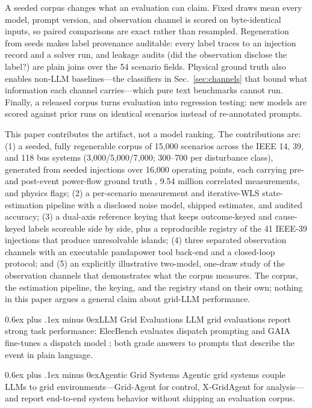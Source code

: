 \documentclass[conference]{IEEEtran}
\makeatletter
\def\subsection{\@startsection{subsection}{2}{\z@}{1.2ex plus 0.2ex minus 0.1ex}%
{0.6ex plus .1ex minus 0ex}{\normalfont\normalsize\itshape}}%
\makeatother
\begin{document}
A seeded corpus changes what an evaluation can claim. Fixed draws mean every model, prompt version, and observation channel is scored on byte-identical inputs, so paired comparisons are exact rather than resampled. Regeneration from seeds makes label provenance auditable: every label traces to an injection record and a solver run, and leakage audits (did the observation disclose the label?) are plain joins over the 54 scenario fields. Physical ground truth also enables non-LLM baselines---the classifiers in Sec.~\ref{sec:channels} that bound what information each channel carries---which pure text benchmarks cannot run. Finally, a released corpus turns evaluation into regression testing: new models are scored against prior runs on identical scenarios instead of re-annotated prompts.

This paper contributes the artifact, not a model ranking. The contributions are: (1) a seeded, fully regenerable corpus of 15,000 scenarios across the IEEE 14, 39, and 118 bus systems (3,000/5,000/7,000; 300--700 per disturbance class), generated from seeded injections over 16,000 operating points, each carrying pre- and post-event power-flow ground truth \cite{wood2014power}, 9.54 million correlated measurements, and physics flags; (2) a per-scenario measurement and iterative-WLS state-estimation pipeline with a disclosed noise model, shipped estimates, and audited accuracy; (3) a dual-axis reference keying that keeps outcome-keyed and cause-keyed labels scoreable side by side, plus a reproducible registry of the 41 IEEE-39 injections that produce unresolvable islands; (4) three separated observation channels with an executable pandapower tool back-end and a closed-loop protocol; and (5) an explicitly illustrative two-model, one-draw study of the observation channels that demonstrates what the corpus measures. The corpus, the estimation pipeline, the keying, and the registry stand on their own; nothing in this paper argues a general claim about grid-LLM performance.

\subsection{LLM Grid Evaluations}
LLM grid evaluations report strong task performance: ElecBench evaluates dispatch prompting \cite{zhou2024elecbench} and GAIA fine-tunes a dispatch model \cite{cheng2025gaia}; both grade answers to prompts that describe the event in plain language.

\subsection{Agentic Grid Systems}
Agentic grid systems couple LLMs to grid environments---Grid-Agent \cite{zhang2025gridagent} for control, X-GridAgent \cite{wen2025xgridagent} for analysis---and report end-to-end system behavior without shipping an evaluation corpus.
\end{document}

